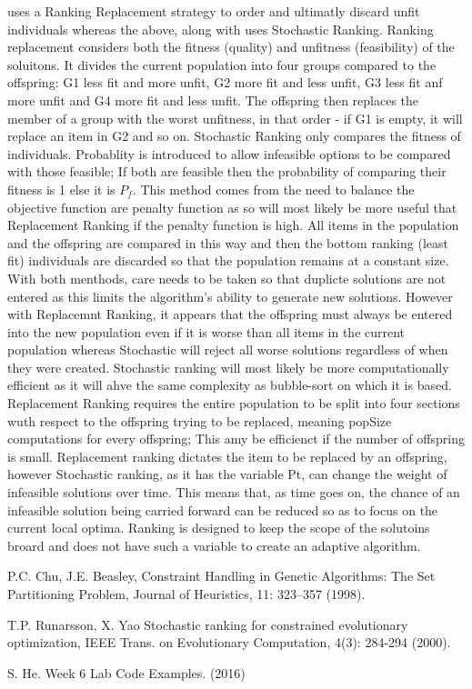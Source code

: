 \documentclass{article}
\begin{document}
\cite{1&3} uses a Ranking Replacement strategy to order and ultimatly discard unfit individuals whereas the above, along with \cite{2} uses Stochastic Ranking. 
\smallbreak
Ranking replacement considers both the fitness (quality) and unfitness (feasibility) of the soluitons. It divides the current population into four groups compared to the offspring: G1 less fit and more unfit, G2 more fit and less unfit, G3 less fit anf more unfit and G4 more fit and less unfit. The offspring then replaces the member of a group with the worst unfitness, in that order - if G1 is empty, it will replace an item in G2 and so on. 
\smallbreak
Stochastic Ranking only compares the fitness of individuals. Probablity is introduced to allow infeasible options to be compared with those feasible; If both are feasible then the probability of comparing their fitness is 1 else it is $P_f$. This method comes from the need to balance the objective function are penalty function as so will most likely be more useful that Replacement Ranking if the penalty function is high. All items in the population and the offspring are compared in this way and then the bottom ranking (least fit) individuals are discarded so that the population remains at a constant size.
\smallbreak
With both menthods, care needs to be taken so that duplicte solutions are not entered as this limits the algorithm's ability to generate new solutions. However with Replacemnt Ranking, it appears that the offspring must always be entered into the new population even if it is worse than all items in the current population whereas Stochastic will reject all worse solutions regardless of when they were created.  
\smallbreak
Stochastic ranking will most likely be more computationally efficient as it will ahve the same complexity as bubble-sort on which it is based. Replacement Ranking requires the entire population to be split into four sections wuth respect to the offspring trying to be replaced, meaning popSize computations for every offspring; This amy be efficienct if the number of offspring is small.
\smallbreak
Replacement ranking dictates the item to be replaced by an offspring, however Stochastic ranking, as it has the variable Pt, can change the weight of infeasible solutions over time. This means that, as time goes on, the chance of an infeasible solution being carried forward can be reduced so as to focus on the current local optima. Ranking is designed to keep the scope of the solutoins broard and does not have such a variable to create an adaptive algorithm. 
 

\begin{thebibliography}{1}

P.C. Chu, J.E. Beasley, Constraint Handling in Genetic Algorithms: The Set Partitioning Problem, Journal of Heuristics, 11: 323–357 (1998). 

T.P. Runarsson, X. Yao Stochastic ranking for constrained evolutionary optimization, IEEE Trans. on Evolutionary Computation, 4(3): 284-294 (2000).

S. He. Week 6 Lab Code Examples. (2016)

\end{thebibliography}
\end{document}
